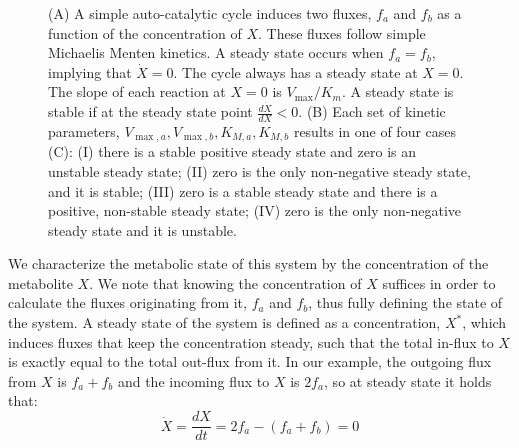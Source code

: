 \documentclass[a4page,notitlepage]{article}
\begin{document}
\begin{figure}[h!]
\begin{minipage}[c]{.65\linewidth}
{}
       \end{minipage}
      \caption{\label{fig:simplecycle}
        (A) A simple auto-catalytic cycle induces two fluxes, $f_a$ and $f_b$ as a function of the concentration of $X$.
        These fluxes follow simple Michaelis Menten kinetics.
        A steady state occurs when $f_a=f_b$, implying that $\dot{X}=0$.
        The cycle always has a steady state at $X=0$.
        The slope of each reaction at $X=0$ is $V_{\max}/K_m$.
        A steady state is stable if at the steady state point $\frac{d\dot{X}}{dX}<0$.
        (B) Each set of kinetic parameters, $V_{\max,a},V_{\max,b},K_{M,a},K_{M,b}$ results in one of four cases (C): 
       (I) there is a stable positive steady state and zero is an unstable steady state; 
       (II) zero is the only non-negative steady state, and it is stable;
       (III) zero is a stable steady state and there is a positive, non-stable steady state; 
       (IV) zero is the only non-negative steady state and it is unstable.}
    \end{figure}

    We characterize the metabolic state of this system by the concentration of the metabolite $X$.
    We note that knowing the concentration of $X$ suffices in order to calculate the fluxes originating from it, $f_a$ and $f_b$, thus fully defining the state of the system.
    A steady state of the system is defined as a concentration, $X^*$, which induces fluxes that keep the concentration steady, such that the total in-flux to $X$ is exactly equal to the total out-flux from it.
    In our example, the outgoing flux from $X$ is $f_a+f_b$ and the incoming flux to $X$ is $2f_a$, so at steady state it holds that:
    \begin{equation}
      \label{eq:xdyna}
      \dot X = \frac{dX}{dt} = 2f_a - (f_a + f_b) = 0
    \end{equation}
\end{document}
